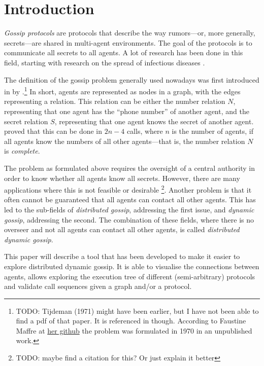 
\section{Introduction}
\label{sec:introduction}

\textit{Gossip protocols} are protocols that describe the way rumors---or, more generally, secrets---are shared in multi-agent environments.
The goal of the protocols is to communicate all secrets to all agents.
A lot of research has been done in this field, 
starting with research on the spread of infectious diseases \parencite{kermack_contribution_1927}.

The definition of the gossip problem generally used nowadays was first introduced in \citeyear{hajnal_cure_1972} by \citeauthor{hajnal_cure_1972}.\footnote{TODO: Tijdeman (1971) might have been earlier, but I have not been able to find a pdf of that paper. It is referenced in \Textcite{van_ditmarsch_dynamic_2018} though. According to Faustine Maffre at \href{https://github.com/FaustineMaffre/GossipProblem-PDDL-generator}{her github} the problem was formulated in 1970 in an unpublished work.}
In short, agents are represented as nodes in a graph, with the edges representing a relation.
This relation can be either the number relation \(N\), representing that one agent has the ``phone number'' of another agent,
and the secret relation \(S\), representing that one agent knows the secret of another agent.
 proved that this can be done in \(2n-4\) calls, where \(n\) is the number of agents, if all agents know the numbers of all other agents---that is, the number relation \(N\) is \textit{complete}.

The problem as formulated above requires the oversight of a central authority in order to know whether all agents know all secrets.
However, there are many applications where this is not feasible or desirable \addcite \footnote{TODO: maybe find a citation for this? Or just explain it better}.
Another problem is that it often cannot be guaranteed that all agents can contact all other agents.
This has led to the sub-fields of \textit{distributed gossip}, addressing the first issue, and \textit{dynamic gossip}, addressing the second.
The combination of these fields, where there is no overseer and not all agents can contact all other agents, is called \textit{distributed dynamic gossip}.


This paper will describe a tool that has been developed to make it easier to explore distributed dynamic gossip.
It is able to visualise the connections between agents, allows exploring the execution tree of different (semi-arbitrary) protocols and validate call sequences given a graph and/or a protocol.

